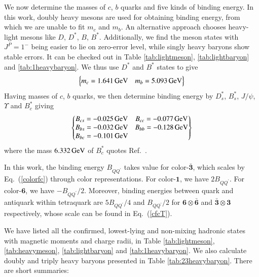 \documentclass[prd,twocolumn,floatfix,nofootinbib]{revtex4}
\begin{document}
We now determine the masses of $c$, $b$ quarks and five kinds of binding energy.
In this work, doubly heavy mesons are used for obtaining binding energy, from which we are unable to fit $m_{c}$ and $m_{b}$.
An alternative approach chooses heavy-light mesons like $D$, $D^{\ast}$, $B$, $B^{\ast}$. 
Additionally, we find the meson states with $J^{P}=1^{-}$ being easier to lie on zero-error level, while singly heavy baryons show stable errors.
It can be checked out in Table \ref{tab:lightmeson}, \ref{tab:lightbaryon} and \ref{tab:1heavybaryon}.
We thus use $D^{\ast}$ and $B^{\ast}$ states to give
\begin{equation}\label{mcmb}
    \begin{Bmatrix}
        m_{c}=1.641\,{\rm GeV} & m_{b}=5.093\,{\rm GeV}
    \end{Bmatrix}
\end{equation}
Having masses of $c$, $b$ quarks, we then determine binding energy by $D_{s}^{\ast}$, $B_{s}^{\ast}$, $J/\psi$, $\Upsilon$ and $B_{c}^{\ast}$ giving
\begin{equation}\label{bingdings}
    \begin{Bmatrix}
        B_{cs}=-0.025\,{\rm GeV} & B_{cc}=-0.077\,{\rm GeV} \\ 
        B_{bs}=-0.032\,{\rm GeV} & B_{bb}=-0.128\,{\rm GeV} \\ 
        B_{bc}=-0.101\,{\rm GeV}
    \end{Bmatrix}
\end{equation}
where the mass $6.332\,{\rm GeV}$ of $B_{c}^{\ast}$ quotes Ref.~\cite{Ebert:2002pp}.

In this work, the binding energy $B_{QQ^{\prime}}$ takes value for color-$\boldsymbol{\bar{3}}$, which scales by Eq.~(\ref{colorfc}) through color representations.
For color-$\boldsymbol{1}$, we have $2B_{QQ^{\prime}}$. For color-$\boldsymbol{6}$, we have $-B_{QQ^{\prime}}/2$.
Moreover, binding energies between quark and antiquark within tetraquark are $5B_{QQ^{\prime}}/4$ and $B_{QQ^{\prime}}/2$ for $\boldsymbol{6}\otimes\boldsymbol{\bar{6}}$ and $\boldsymbol{\bar{3}}\otimes\boldsymbol{3}$ respectively, 
whose scale can be found in Eq.~(\ref{cfcT}).

We have listed all the confirmed, lowest-lying and non-mixing hadronic states with magnetic moments and charge radii, in Table \ref{tab:lightmeson}, \ref{tab:heavymeson}, \ref{tab:lightbaryon} and \ref{tab:1heavybaryon}.
We also calculate doubly and triply heavy baryons presented in Table \ref{tab:23heavybaryon}.
There are short summaries:
\end{document}
